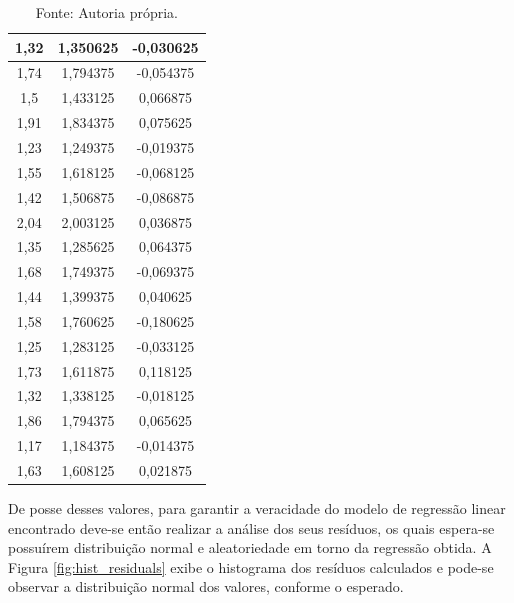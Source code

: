 \begin{table}[H]
\begin{tabular}{|c|c|c|}
  1,32           & 1,350625          & -0,030625        \\ \hline
  1,74           & 1,794375          & -0,054375        \\ \hline
  1,5            & 1,433125          & 0,066875         \\ \hline
  1,91           & 1,834375          & 0,075625         \\ \hline
  1,23           & 1,249375          & -0,019375        \\ \hline
  1,55           & 1,618125          & -0,068125        \\ \hline
  1,42           & 1,506875          & -0,086875        \\ \hline
  2,04           & 2,003125          & 0,036875         \\ \hline
  1,35           & 1,285625          & 0,064375         \\ \hline
  1,68           & 1,749375          & -0,069375        \\ \hline
  1,44           & 1,399375          & 0,040625         \\ \hline
  1,58           & 1,760625          & -0,180625        \\ \hline
  1,25           & 1,283125          & -0,033125        \\ \hline
  1,73           & 1,611875          & 0,118125         \\ \hline
  1,32           & 1,338125          & -0,018125        \\ \hline
  1,86           & 1,794375          & 0,065625         \\ \hline
  1,17           & 1,184375          & -0,014375        \\ \hline
  1,63           & 1,608125          & 0,021875         \\ \hline
  \end{tabular}
  \label{tab:residuos}
  \caption*{Fonte: Autoria própria.}
  \end{table}

De posse desses valores, para garantir a veracidade do modelo de regressão linear encontrado deve-se então realizar a análise dos seus resíduos, os quais espera-se possuírem distribuição normal e aleatoriedade em torno da regressão obtida.  A Figura \ref{fig:hist_residuals} exibe o histograma dos resíduos calculados e pode-se observar a distribuição normal dos valores, conforme o esperado.

